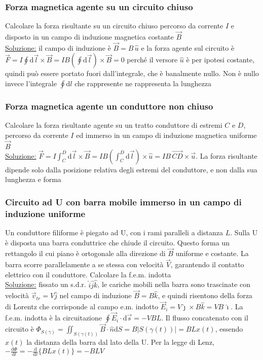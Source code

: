 \documentclass[11pt,a4paper]{article}
\begin{document}
\subsubsection{Forza magnetica agente su un circuito chiuso}
Calcolare la forza risultante su un circuito chiuso percorso da corrente $I$ e disposto in un campo di induzione magnetica costante $\vec B$\\
\underline{Soluzione:} il campo di induzione è $\vec B=B\,\hat u$ e la forza agente sul circuito è $\vec F=I\oint\mathrm d\vec l\times\vec B=IB(\oint\mathrm d\vec l)\times \vec B=0$ perché il versore $\hat u$ è per ipotesi costante, quindi può essere portato fuori dall'integrale, che è banalmente nullo. Non è nullo invece l'integrale $\oint \mathrm dl$ che rappresente ne rappresenta la lunghezza

\subsubsection{Forza magnetica agente un conduttore non chiuso}
Calcolare la forza risultante agente su un tratto conduttore di estremi $C$ e $D$, percorso da corrente $I$ ed immerso in un campo di induzione magnetica uniforme $\vec B$\\
\underline{Soluzione:} $\vec F=I\int_C^D\mathrm d\vec l\times \vec B=IB(\int_C^D\mathrm d\vec l)\times\hat u=IB\,\overrightarrow{CD}\times\vec u$. La forza risultante dipende solo dalla posizione relativa degli estremi del conduttore, e non dalla sua lunghezza e forma

\subsubsection{Circuito ad U con barra mobile immerso in un campo di induzione uniforme}
Un conduttore filiforme è piegato ad U, con i rami paralleli a distanza $L$. Sulla U è disposta una barra conduttrice che chiude il circuito. Questo forma un rettangolo il cui piano è ortogonale alla direzione di $\vec B$ uniforme e costante. La barra scorre parallelamente a se stessa con velocità $\vec V$, garantendo il contatto elettrico con il conduttore. Calcolare la f.e.m. indotta\\
\underline{Soluzione:} fissato un s.d.r. $\hat i\hat j\hat k$, le cariche mobili nella barra sono trascinate con velocità $\vec v_{tr}=V\hat j$ nel campo di induzione $\vec B=B\hat k$, e quindi risentono della forza di Lorentz che corrisponde al campo e.m. indotto $\vec E_i=V\hat\jmath\times B\hat k=VB\,\hat\imath$. La f.e.m. indotta è la circuitazione $\oint\vec E_i\cdot\mathrm d\vec s=-VBL$. Il flusso concatenato con il circuito è $\Phi_{S(\gamma)}=\iint_{S(\gamma(t))}\vec B\cdot\hat n\mathrm dS=B|S(\gamma(t))|=BLx(t)$, essendo $x(t)$ la distanza della barra dal lato della U. Per la legge di Lenz, $-\frac{\mathrm d\Phi}{\mathrm dt}=-\frac{\mathrm d}{\mathrm dt}\{BLx(t)\}=-BLV$
\end{document}
